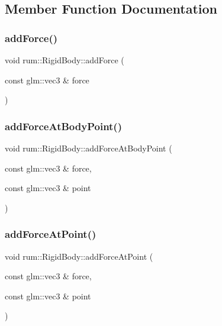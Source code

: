 \subsection{Member Function Documentation}
\mbox{\label{classrum_1_1_rigid_body_a82678048704e31e6781d107c89094706}} 
\subsubsection{\texorpdfstring{add\+Force()}{addForce()}}
{\footnotesize\ttfamily void rum\+::\+Rigid\+Body\+::add\+Force (\begin{DoxyParamCaption}\item[{const glm\+::vec3 \&}]{force }\end{DoxyParamCaption})}

\mbox{\label{classrum_1_1_rigid_body_a5025fc4cc7be3202b84485ae2fdfdcf7}} 
\subsubsection{\texorpdfstring{add\+Force\+At\+Body\+Point()}{addForceAtBodyPoint()}}
{\footnotesize\ttfamily void rum\+::\+Rigid\+Body\+::add\+Force\+At\+Body\+Point (\begin{DoxyParamCaption}\item[{const glm\+::vec3 \&}]{force,  }\item[{const glm\+::vec3 \&}]{point }\end{DoxyParamCaption})}

\mbox{\label{classrum_1_1_rigid_body_a8bfbbe5f4c71e6e3d484479bcbf98b8e}} 
\subsubsection{\texorpdfstring{add\+Force\+At\+Point()}{addForceAtPoint()}}
{\footnotesize\ttfamily void rum\+::\+Rigid\+Body\+::add\+Force\+At\+Point (\begin{DoxyParamCaption}\item[{const glm\+::vec3 \&}]{force,  }\item[{const glm\+::vec3 \&}]{point }\end{DoxyParamCaption})}


